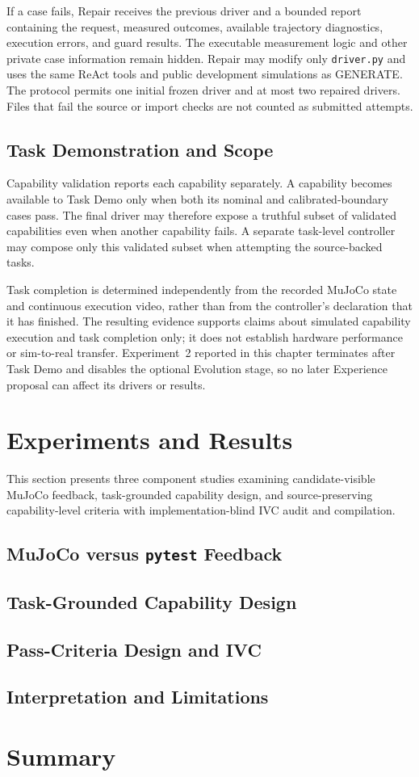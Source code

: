 If a case fails, Repair receives the previous driver and a bounded report
containing the request, measured outcomes, available trajectory diagnostics,
execution errors, and guard results. The executable measurement logic and
other private case information remain hidden. Repair may modify only
\texttt{driver.py} and uses the same ReAct tools and public development
simulations as GENERATE. The protocol permits one initial frozen driver and at
most two repaired drivers. Files that fail the source or import checks are not
counted as submitted attempts.

\subsection{Task Demonstration and Scope}

Capability validation reports each capability separately. A capability becomes
available to Task Demo only when both its nominal and calibrated-boundary cases
pass. The final driver may therefore expose a truthful subset of validated
capabilities even when another capability fails. A separate task-level
controller may compose only this validated subset when attempting the
source-backed tasks.

Task completion is determined independently from the recorded MuJoCo state and
continuous execution video, rather than from the controller's declaration that
it has finished. The resulting evidence supports claims about simulated
capability execution and task completion only; it does not establish hardware
performance or sim-to-real transfer. Experiment~2 reported in this chapter
terminates after Task Demo and disables the optional Evolution stage, so no
later Experience proposal can affect its drivers or results.

\section{Experiments and Results}

This section presents three component studies examining candidate-visible
MuJoCo feedback, task-grounded capability design, and source-preserving
capability-level criteria with implementation-blind IVC audit and compilation.

\subsection{MuJoCo versus \texttt{pytest} Feedback}

\subsection{Task-Grounded Capability Design}

\subsection{Pass-Criteria Design and IVC}

\subsection{Interpretation and Limitations}

\section{Summary}
